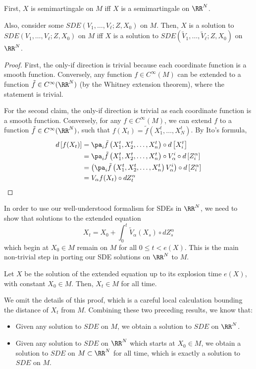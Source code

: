 \documentclass{scrartcl}
\begin{document}
\begin{claim*}
    First, $X$ is semimartingale on $M$ iff $X$ is a semimartingale on $\RR^N$.

    Also, consider some $SDE(V_1,\dots, V_\ell; Z, X_0)$ on $M$. Then, $X$ is a solution to $SDE(V_1,\dots, V_\ell; Z, X_0)$ on $M$ iff $X$ is a solution to $SDE(\tilde{V}_1,\dots, \tilde{V}_\ell; Z, X_0)$ on $\RR^N$.
\end{claim*}
\begin{proof}
First, the only-if direction is trivial because each coordinate function is a smooth function. Conversely, any function $f\in C^\infty(M)$ can be extended to a function $\tilde{f}\in C^\infty(\RR^N)$ (by the Whitney extension theorem), where the statement is trivial.

For the second claim, the only-if direction is trivial as each coordinate function is a smooth function. Conversely, for any $f\in C^\infty(M)$, we can extend $f$ to a function $\tilde{f}\in C^\infty(\RR^N)$, such that $f(X_t) = \tilde{f}(X^t_1,\dots, X^t_N)$. By Ito's formula,
\begin{align*}
    d\left[f(X_t)\right] &= \pa_i \tilde{f}\left(X^t_1, X^t_2, \dots, X^t_n\right)\circ d\left[X^t_i\right]\\
    &= \pa_i \tilde{f}\left(X^t_1, X^t_2, \dots, X^t_n\right)\circ V^i_\alpha \circ d\left[Z^\alpha_i\right]\\
    &= \left(\pa_i \tilde{f}\left(X^t_1, X^t_2, \dots, X^t_n\right) V^i_\alpha \right) \circ d\left[Z^\alpha_i\right]\\
    &= V_\alpha f(X_t)\circ dZ^\alpha_t
\end{align*}
\end{proof}
In order to use our well-understood formalism for SDEs in $\RR^N$, we need to show that solutions to the extended equation
\[
    X_t = X_0 + \int_0^t \tilde{V}_\alpha(X_s)\circ dZ_s^\alpha    
\]
which begin at $X_0\in M$ remain on $M$ for all $0\leq t < e(X)$. This is the main non-trivial step in porting our SDE solutions on $\RR^N$ to $M$.

\begin{claim*}
    Let $X$ be the solution of the extended equation up to its explosion time $e(X)$, with constant $X_0 \in M$. Then, $X_t\in M$ for all time.
\end{claim*}

We omit the details of this proof\cite{Hsu2002}, which is a careful local calculation bounding the distance of $X_t$ from $M$. Combining these two preceding results, we know that:
\begin{itemize}
    \item Given any solution to $SDE$ on $M$, we obtain a solution to $SDE$ on $\RR^N$.
    \item Given any solution to $SDE$ on $\RR^N$ which starts at $X_0\in M$, we obtain a solution to $SDE$ on $M\subset \RR^N$ for all time, which is exactly a solution to $SDE$ on $M$.
\end{itemize}
\end{document}
